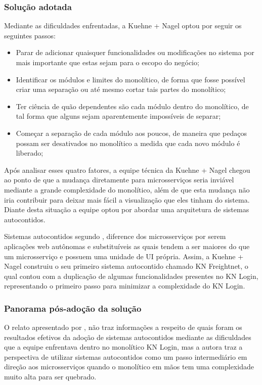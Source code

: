 \subsubsection{Solução adotada}

Mediante as dificuldades enfrentadas, a Kuehne + Nagel optou por seguir os seguintes passos:

\begin{itemize}
    \item Parar de adicionar quaisquer funcionalidades ou modificações no sistema por mais
        importante que estas sejam para o escopo do negócio;
    \item Identificar os módulos e limites do monolítico, de forma que fosse possível criar uma
        separação ou até mesmo cortar tais partes do monolítico;
    \item Ter ciência de quão dependentes são cada módulo dentro do monolítico, de tal forma que
        alguns sejam aparentemente impossíveis de separar;
    \item Começar a separação de cada módulo aos poucos, de maneira que pedaços possam ser
        desativados no monolítico a medida que cada novo módulo é liberado;
\end{itemize}

Após analisar esses quatro fatores, a equipe técnica da Kuehne + Nagel chegou ao ponto de que a
mudança diretamente para microsserviços seria inviável mediante a grande complexidade do monolítico,
além de que esta mudança não iria contribuir para deixar mais fácil a visualização que eles
tinham do sistema. Diante desta situação a equipe optou por abordar uma arquitetura de sistemas
autocontidos.

Sistemas autocontidos segundo , diference dos
microsserviços por serem aplicações web autônomas e substituíveis as quais tendem a ser maiores do
que um microsserviço e possuem uma unidade de \gls{UI} própria. Assim, a Kuehne + Nagel construiu o
seu primeiro sistema autocontido chamado KN Freightnet, o qual contou com a duplicação de algumas
funcionalidades presentes no KN Login, representando o primeiro passo para minimizar a complexidade
do KN Login.

\subsubsection{Panorama pós-adoção da solução}

O relato apresentado por , não traz informações a respeito
de quais foram os resultados efetivos da adoção de sistemas autocontidos mediante as dificuldades
que a equipe enfrentava dentro no monolítico KN Login, mas a autora traz a perspectiva de utilizar
sistemas autocontidos como um passo intermediário em direção aos microsserviços quando o monolítico
em mãos tem uma complexidade muito alta para ser quebrado.

